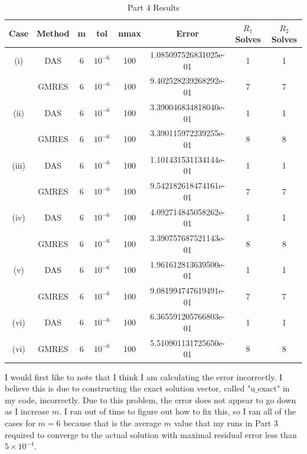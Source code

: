 \documentclass[12pt]{article}
\begin{document}
\begin{table}[H]
\centering
\renewcommand{\arraystretch}{1.3}
\begin{small}
\begin{tabular}{| c || c | c | c | c | c | c | c |}
\hline
\textbf{Case} & \textbf{Method} & \textbf{m} & \textbf{tol} & \textbf{nmax} &  \textbf{Error} & \textbf{$R_1$ Solves} & \textbf{$R_2$ Solves}\\
\hline 
\hline
(i)  & DAS  & 6  & $10^{-6}$  & 100  & 1.085097526831025e-01  &  1 &  1 \\
  & GMRES  &  6 &  $10^{-6}$ & 100  &  9.402528239268292e-01 &  7 &  7 \\
\hline
(ii)  & DAS  & 6  & $10^{-6}$  & 100  & 3.390046834818040e-01  & 1  &  1 \\
  & GMRES  & 6  &  $10^{-6}$ & 100  & 3.390115972239255e-01  &  8 &  8 \\
\hline
(iii)  & DAS  & 6  & $10^{-6}$  & 100  & 1.101431531134144e-01  & 1  &  1 \\
  & GMRES  & 6  & $10^{-6}$  & 100  &  9.542182618474161e-01 &  7 & 7  \\
\hline
(iv)  &  DAS &  6 & $10^{-6}$  & 100  & 4.092714845058262e-01  & 1  &  1 \\
  & GMRES  & 6  &  $10^{-6}$ & 100  & 3.390757687521143e-01  & 8  & 8  \\
\hline
(v)  & DAS  & 6 & $10^{-6}$  & 100  &  1.961612813639500e-01 & 1  & 1  \\
  &  GMRES &  6 & $10^{-6}$  & 100  & 9.081994747619491e-01  & 7  & 7  \\
\hline
(vi)  & DAS  & 6  &  $10^{-6}$ & 100  & 6.365591205766803e-01  & 1  & 1  \\
(vi)  & GMRES  & 6  & $10^{-6}$  & 100  &  5.510901131725650e-01 &  8 & 8  \\

\hline
\end{tabular}
\end{small}
\caption{Part 4 Results}
\end{table} 

I would first like to note that I think I am calculating the error incorrectly.  I believe this is due to constructing the exact solution vector, called $\text{"u\_exact"}$ in my code, incorrectly.  Due to this problem, the error does not appear to go down as I increase $m$.  I ran out of time to figure out how to fix this, so I ran all of the cases for $m = 6$ because that is the average $m$ value that my runs in Part 3 required to converge to the actual solution with maximal residual error less than $5 \times 10^{-4}$.\\
\end{document}
